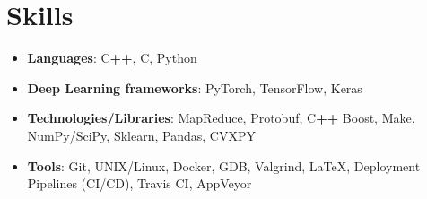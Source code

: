 \documentclass[letterpaper,11pt]{article}
\newcommand\spaceAfterSubItems{6pt}
\newcommand\spaceBetweenResumeItems{-2pt}
\newcommand\spaceBetweenResumeSebitems{-4pt}
\newcommand{\resumeItem}[2]{
    \item\small{
        \textbf{#1}{: #2 \vspace{\spaceBetweenResumeItems}}
    }
}
\newcommand{\resumeSubItem}[2]{
    \resumeItem{#1}{#2}\vspace{\spaceBetweenResumeSebitems}
}
\newcommand{\resumeSubHeadingListStart}{\begin{itemize}[leftmargin=*]}
\newcommand{\resumeSubHeadingListEnd}{\end{itemize}}
\begin{document}
\section{Skills}
\resumeSubHeadingListStart

\resumeSubItem{Languages}{C\textbf{\footnotesize++}, C, Python}
\resumeSubItem{Deep Learning frameworks}{PyTorch, TensorFlow, Keras}
\resumeSubItem{Technologies/Libraries}{MapReduce, Protobuf, 
    C\textbf{\footnotesize++} Boost, Make, NumPy/SciPy, Sklearn, Pandas,
    CVXPY
}
\resumeSubItem{Tools}{Git, UNIX/Linux, Docker, GDB, Valgrind, \LaTeX,
    Deployment Pipelines (CI/CD), Travis CI, AppVeyor
}

\vspace{\spaceAfterSubItems}

\resumeSubHeadingListEnd



\end{document}
